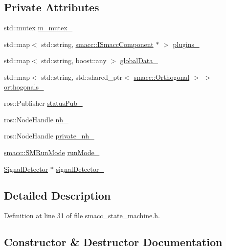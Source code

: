 \subsection*{Private Attributes}
\begin{DoxyCompactItemize}
\item 
std\+::mutex \hyperlink{classsmacc_1_1ISmaccStateMachine_a0eecb19258e0ec026029c7755dbb94d7}{m\+\_\+mutex\+\_\+}
\item 
std\+::map$<$ std\+::string, \hyperlink{classsmacc_1_1ISmaccComponent}{smacc\+::\+I\+Smacc\+Component} $\ast$ $>$ \hyperlink{classsmacc_1_1ISmaccStateMachine_aaf2f1f4dec865e5b6a92a6fb231f204f}{plugins\+\_\+}
\item 
std\+::map$<$ std\+::string, boost\+::any $>$ \hyperlink{classsmacc_1_1ISmaccStateMachine_a4af5edfc2584f74409ca194d2d869fac}{global\+Data\+\_\+}
\item 
std\+::map$<$ std\+::string, std\+::shared\+\_\+ptr$<$ \hyperlink{classsmacc_1_1Orthogonal}{smacc\+::\+Orthogonal} $>$ $>$ \hyperlink{classsmacc_1_1ISmaccStateMachine_ae8e5c25d0aecd91fe496df13751bc667}{orthogonals\+\_\+}
\item 
ros\+::\+Publisher \hyperlink{classsmacc_1_1ISmaccStateMachine_a7360ef485d5c83a3811dfe3eaa3a0c20}{status\+Pub\+\_\+}
\item 
ros\+::\+Node\+Handle \hyperlink{classsmacc_1_1ISmaccStateMachine_ad8877bcca9dbb345fe72cca839c93dd3}{nh\+\_\+}
\item 
ros\+::\+Node\+Handle \hyperlink{classsmacc_1_1ISmaccStateMachine_a9c6a5c647ecca6599589c12fdcd53bfc}{private\+\_\+nh\+\_\+}
\item 
\hyperlink{namespacesmacc_a3e4f79486ea6ea6342dd3c712d16a4f6}{smacc\+::\+S\+M\+Run\+Mode} \hyperlink{classsmacc_1_1ISmaccStateMachine_a9f8cfbf577f7ae7a48b7a328e2e6b589}{run\+Mode\+\_\+}
\item 
\hyperlink{classsmacc_1_1SignalDetector}{Signal\+Detector} $\ast$ \hyperlink{classsmacc_1_1ISmaccStateMachine_a3982eb671f5f001cb047d3a467789986}{signal\+Detector\+\_\+}
\end{DoxyCompactItemize}


\subsection{Detailed Description}


Definition at line 31 of file smacc\+\_\+state\+\_\+machine.\+h.



\subsection{Constructor \& Destructor Documentation}
